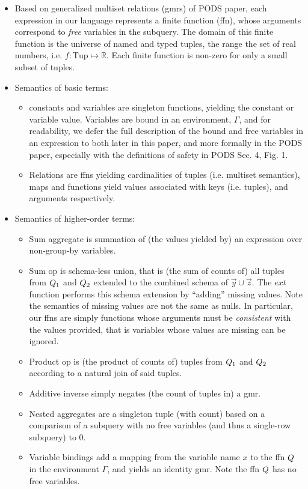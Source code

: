 \begin{itemize}
  \item Based on generalized multiset relations (gmrs) of PODS paper, each
  expression in our language represents a finite function (ffn), whose
  arguments correspond to \textit{free} variables in the subquery. The domain
  of this finite function is the universe of named and typed tuples, the range
  the set of real numbers, i.e. $f : \mbox{Tup} \mapsto \mathbb{R}$. Each
  finite function is non-zero for only a small subset of tuples.
  \item Semantics of basic terms:
  \begin{itemize}
    \item constants and variables are singleton functions, yielding the
    constant or variable value. Variables are bound in an environment,
    $\Gamma$, and for readability, we defer the full description of the bound
    and free variables in an expression to both later in this paper, and more
    formally in the PODS paper, especially with the definitions of safety in
    PODS Sec. 4, Fig. 1.
    \item Relations are ffns yielding cardinalities of tuples (i.e. multiset
    semantics), maps and functions yield values associated with keys (i.e.
    tuples), and arguments respectively.
  \end{itemize} 
  
  \item Semantics of higher-order terms:
  \begin{itemize}
    \item Sum aggregate is summation of (the values yielded by) an expression
    over non-group-by variables.
    \item Sum op is schema-less union, that is (the sum of counts of) all tuples
    from $Q_1$ and $Q_2$ extended to the combined schema of $\vec{y} \cup
    \vec{z}$. The $ext$ function performs this schema extension by ``adding''
    missing values. Note the semantics of missing values are not the same as
    nulls. In particular, our ffns are simply functions whose arguments must be
    \textit{consistent} with the values provided, that is variables whose
    values are missing can be ignored.
    \item Product op is (the product of counts of) tuples from $Q_1$ and
    $Q_2$ according to a natural join of said tuples.
    \item Additive inverse simply negates (the count of tuples in) a gmr.
    \item Nested aggregates are a singleton tuple (with count) based on a
    comparison of a subquery with no free variables (and thus a single-row
    subquery) to 0.
    \item Variable bindings add a mapping from the variable name $x$ to the
    ffn $Q$ in the environment $\Gamma$, and yields an identity gmr. Note the
    ffn $Q$ has no free variables.
  \end{itemize} 
  
\end{itemize}

